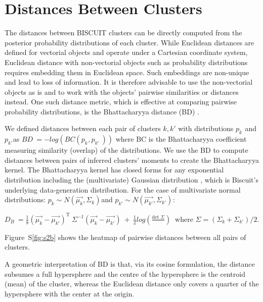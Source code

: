 \section{Distances Between Clusters}

The distances between BISCUIT clusters can be directly computed from the posterior probability distributions of each cluster. 
While Euclidean distances are defined for vectorial objects and operate under a Cartesian coordinate system, Euclidean distance with non-vectorial objects such as probability distributions requires embedding them in Euclidean space.
Such embeddings are non-unique and lead to loss of information.
It is therefore advisable to use the non-vectorial objects as is and to work with the objects' pairwise similarities or distances instead.
One such distance metric, which is effective at comparing pairwise probability distributions, is the Bhattacharyya distance (BD) \citep{Bhattacharyya1990}.

We defined distances between each pair of clusters \(k,k'\) with distributions \({p_{k}}^{}\) and \({p_{k'}}^{}\)as \(BD\  = - log(BC({p_{k}}^{},{p_{k'}}^{\ }))\) where \(\text{BC}\) is the Bhattacharyya coefficient measuring similarity (overlap) of the distributions.
We use the BD to compute distances between pairs of inferred clusters' moments to create the Bhattacharyya kernel.
The Bhattacharyya kernel has closed forms for any exponential distribution including the (multivariate) Gaussian distribution \citep{Jebara2004}, which is Biscuit's underlying data-generation distribution.
For the case of multivariate normal distributions: \({p_{k} \sim N(\overrightarrow{\mu_{k}},\Sigma_{k})}^{}\)and \({p_{k'} \sim N(\overrightarrow{\mu_{k'}},\Sigma_{k'})}^{}\):

\(D_{B}\  = \frac{1}{8}(\overrightarrow{\mu_{k}} - \overrightarrow{\mu_{k'}})^{\text{T\ }}\Sigma^{- 1}(\overrightarrow{\mu_{k}} - \overrightarrow{\mu_{k'}})\  + \ \frac{1}{2}log(\frac{\text{det\ }\Sigma}{})\ \) where \(\Sigma = (\Sigma_{k} + \Sigma_{k'})/2\).

Figure~S\ref{fig:s2b}  shows the heatmap of pairwise distances between all pairs of
clusters.

A geometric interpretation of BD is that, via its cosine formulation, the distance subsumes a full hypersphere and the centre of the hypersphere is the centroid (mean) of the cluster, whereas the Euclidean distance only covers a quarter of the hypersphere with the center at the origin. %

